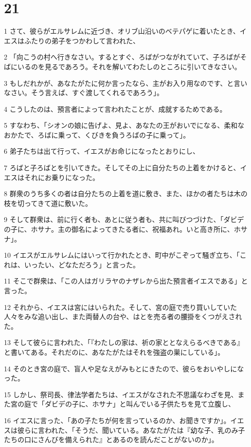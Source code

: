 \chapter{21}

\par 1 さて、彼らがエルサレムに近づき、オリブ山沿いのベテパゲに着いたとき、イエスはふたりの弟子をつかわして言われた、
\par 2 「向こうの村へ行きなさい。するとすぐ、ろばがつながれていて、子ろばがそばにいるのを見るであろう。それを解いてわたしのところに引いてきなさい。
\par 3 もしだれかが、あなたがたに何か言ったなら、主がお入り用なのです、と言いなさい。そう言えば、すぐ渡してくれるであろう」。
\par 4 こうしたのは、預言者によって言われたことが、成就するためである。
\par 5 すなわち、「シオンの娘に告げよ、見よ、あなたの王がおいでになる、柔和なおかたで、ろばに乗って、くびきを負うろばの子に乗って」。
\par 6 弟子たちは出て行って、イエスがお命じになったとおりにし、
\par 7 ろばと子ろばとを引いてきた。そしてその上に自分たちの上着をかけると、イエスはそれにお乗りになった。
\par 8 群衆のうち多くの者は自分たちの上着を道に敷き、また、ほかの者たちは木の枝を切ってきて道に敷いた。
\par 9 そして群衆は、前に行く者も、あとに従う者も、共に叫びつづけた、「ダビデの子に、ホサナ。主の御名によってきたる者に、祝福あれ。いと高き所に、ホサナ」。
\par 10 イエスがエルサレムにはいって行かれたとき、町中がこぞって騒ぎ立ち、「これは、いったい、どなただろう」と言った。
\par 11 そこで群衆は、「この人はガリラヤのナザレから出た預言者イエスである」と言った。
\par 12 それから、イエスは宮にはいられた。そして、宮の庭で売り買いしていた人々をみな追い出し、また両替人の台や、はとを売る者の腰掛をくつがえされた。
\par 13 そして彼らに言われた、「『わたしの家は、祈の家ととなえらるべきである』と書いてある。それだのに、あなたがたはそれを強盗の巣にしている」。
\par 14 そのとき宮の庭で、盲人や足なえがみもとにきたので、彼らをおいやしになった。
\par 15 しかし、祭司長、律法学者たちは、イエスがなされた不思議なわざを見、また宮の庭で「ダビデの子に、ホサナ」と叫んでいる子供たちを見て立腹し、
\par 16 イエスに言った、「あの子たちが何を言っているのか、お聞きですか」。イエスは彼らに言われた、「そうだ、聞いている。あなたがたは『幼な子、乳のみ子たちの口にさんびを備えられた』とあるのを読んだことがないのか」。
